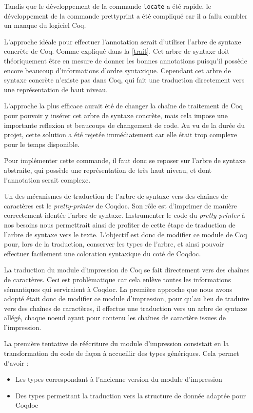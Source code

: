 \documentclass[a4paper, 11pt]{report}
\begin{document}
    Tandis que le développement de la commande \texttt{locate} a été rapide,
    le développement de la commande prettyprint a été compliqué car il a fallu
    combler un manque du logiciel Coq.

    L'approche idéale pour effectuer l'annotation serait d'utiliser
    l'arbre de syntaxe concrète de Coq. Comme expliqué dans la \cref{trait}.
    Cet arbre de syntaxe doit théoriquement être en mesure de donner les bonnes
    annotations puisqu'il possède encore beaucoup d'informations d'ordre
    syntaxique. Cependant cet arbre de syntaxe concrète n'existe pas dans Coq,
    qui fait une traduction directement vers une représentation de haut niveau.

    L'approche la plus efficace aurait été de changer la chaîne de traitement
    de Coq pour pouvoir y insérer cet arbre de syntaxe concrète, mais cela
    impose une importante reflexion et beaucoups de changement de code. Au
    vu de la durée du projet, cette solution a été rejetée immédiatement car
    elle était trop complexe pour le temps disponible.

    Pour implémenter cette commande, il faut donc se reposer sur l'arbre de
    syntaxe abstraite, qui possède une représentation de très haut niveau,
    et dont l'annotation serait complexe.

    Un des mécanismes de traduction de l'arbre de syntaxe vers des chaînes de
    caractères est le \textit{pretty-printer} de Coqdoc. Son rôle est
    d'imprimer de manière correctement identée l'arbre de syntaxe.
    Instrumenter le code du \textit{pretty-printer} à nos besoins nous
    permettrait ainsi de profiter de cette étape de traduction de l'arbre de
    syntaxe vers le texte. L'objectif est donc de modifier ce module de Coq
    pour, lors de la traduction, conserver les types de l'arbre, et ainsi
    pouvoir effectuer facilement une coloration syntaxique du coté de Coqdoc.

    La traduction du module d'impression de Coq se fait directement vers des
    chaînes de caractères. Ceci est problèmatique car cela enlève toutes les
    informations sémantiques qui serviraient à Coqdoc. La première approche
    que nous avons adopté était donc de modifier ce module d'impression, pour
    qu'au lieu de traduire vers des chaînes de caractères, il effectue une
    traduction vers un arbre de syntaxe allégé, chaque noeud ayant pour contenu
    les chaînes de caractère issues de l'impression.

    La première tentative de réécriture du module d'impression consistait
    en la transformation du code de façon à accueillir des types génériques.
    Cela permet d'avoir :
    \begin{itemize}
      \item Les types correspondant à l'ancienne version du module d'impression
      \item Des types permettant la traduction vers la structure de donnée
        adaptée pour Coqdoc
    \end{itemize}
\end{document}

